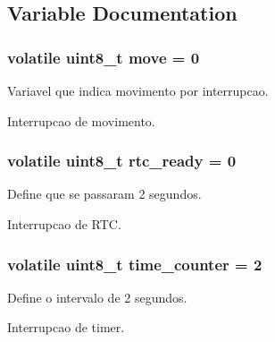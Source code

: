 \subsection{Variable Documentation}
\hypertarget{group__main__module_ga3ec3246b6885ab76d880359df143c477}{
\subsubsection[{move}]{\setlength{\rightskip}{0pt plus 5cm}volatile uint8\-\_\-t move = 0}}\label{group__main__module_ga3ec3246b6885ab76d880359df143c477}


Variavel que indica movimento por interrupcao. 

Interrupcao de movimento. \hypertarget{group__main__module_ga7633574c3e3924ff2d07ee88bba5a018}{
\subsubsection[{rtc\-\_\-ready}]{\setlength{\rightskip}{0pt plus 5cm}volatile uint8\-\_\-t rtc\-\_\-ready = 0}}\label{group__main__module_ga7633574c3e3924ff2d07ee88bba5a018}


Define que se passaram 2 segundos. 

Interrupcao de R\-T\-C. \hypertarget{group__main__module_ga31e91be760295a7e79d975c1567f3c80}{
\subsubsection[{time\-\_\-counter}]{\setlength{\rightskip}{0pt plus 5cm}volatile uint8\-\_\-t time\-\_\-counter = 2}}\label{group__main__module_ga31e91be760295a7e79d975c1567f3c80}


Define o intervalo de 2 segundos. 

Interrupcao de timer. 